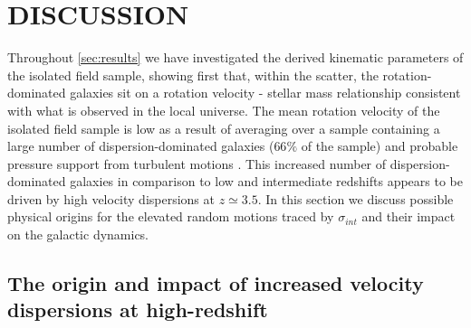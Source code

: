 \documentclass[fleqn,usenatbib]{mnras}
\begin{document}
\section{DISCUSSION}\label{sec:discussion}

Throughout \cref{sec:results} we have investigated the derived kinematic parameters of the isolated field sample, showing first that, within the scatter, the rotation-dominated galaxies sit on a rotation velocity - stellar mass relationship consistent with what is observed in the local universe.
The mean rotation velocity of the isolated field sample is low as a result of averaging over a sample containing a large number of dispersion-dominated galaxies ($66\%$ of the sample) and probable pressure support from turbulent motions \citep[e.g.][]{Burkert2010}.
This increased number of dispersion-dominated galaxies in comparison to low and intermediate redshifts appears to be driven by high velocity dispersions at $z\simeq3.5$.
In this section we discuss possible physical origins for the elevated random motions traced by $\sigma_{int}$ and their impact on the galactic dynamics.

\subsection{The origin and impact of increased velocity dispersions at high-redshift}\label{discussion_increase_in_sigma}
\end{document}
